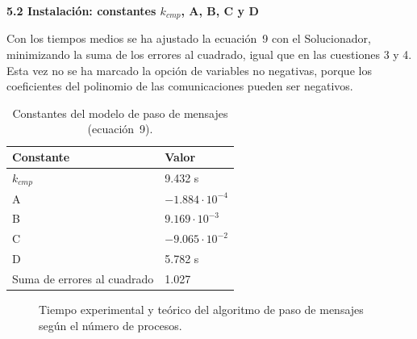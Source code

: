 \documentclass[12pt]{article}
\begin{document}
\begin{enumerate}
\medskip
\noindent\textbf{5.2 Instalación: constantes $k_{cmp}$, A, B, C y D}\par
\smallskip

Con los tiempos medios se ha ajustado la ecuación~9 con el Solucionador, minimizando la suma de los errores al cuadrado, igual que en las cuestiones 3 y 4. Esta vez no se ha marcado la opción de variables no negativas, porque los coeficientes del polinomio de las comunicaciones pueden ser negativos.

\begin{table}[htbp]
\centering
\begin{tabular}{ll}
\toprule
\textbf{Constante} & \textbf{Valor} \\
\midrule
$k_{cmp}$ & 9.432 s \\
A & $-1.884 \cdot 10^{-4}$ \\
B & $9.169 \cdot 10^{-3}$ \\
C & $-9.065 \cdot 10^{-2}$ \\
D & 5.782 s \\
Suma de errores al cuadrado & 1.027 \\
\bottomrule
\end{tabular}
\caption{Constantes del modelo de paso de mensajes (ecuación~9).}
\label{tab:c5_constantes}
\end{table}

\begin{figure}[htbp]
\centering
{}
\caption{Tiempo experimental y teórico del algoritmo de paso de mensajes según el número de procesos.}
\label{fig:c5_ajuste}
\end{figure}


\end{enumerate}
\end{document}
